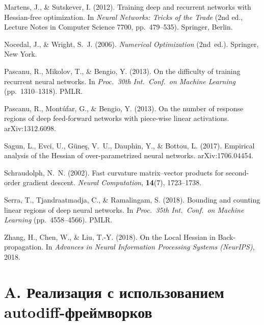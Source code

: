 \documentclass[11pt]{article}
\begin{document}
\begin{thebibliography}{99}
  Martens, J., \& Sutskever, I. (2012).
  \newblock Training deep and recurrent networks with Hessian-free optimization.
  \newblock In \emph{Neural Networks: Tricks of the Trade}
  (2nd ed., Lecture Notes in Computer Science 7700, pp.~479--535).
  Springer, Berlin.

  Nocedal, J., \& Wright, S.~J. (2006).
  \newblock \emph{Numerical Optimization} (2nd~ed.).
  \newblock Springer, New York.

  Pascanu, R., Mikolov, T., \& Bengio, Y. (2013{}).
  \newblock On the difficulty of training recurrent neural networks.
  \newblock In \emph{Proc.\ 30th Int.\ Conf.\ on Machine Learning}
  (pp.~1310--1318). PMLR.

  Pascanu, R., Montúfar, G., \& Bengio, Y. (2013{}).
  \newblock On the number of response regions of deep feed-forward networks with
  piece-wise linear activations.
  \newblock arXiv:1312.6098.

  Sagun, L., Evci, U., Güneş, V.~U., Dauphin, Y., \& Bottou, L. (2017).
  \newblock Empirical analysis of the Hessian of over-parametrized neural
  networks.
  \newblock arXiv:1706.04454.

  Schraudolph, N.~N. (2002).
  \newblock Fast curvature matrix–vector products for second-order gradient
  descent.
  \newblock \emph{Neural Computation}, \textbf{14}(7), 1723--1738.

  Serra, T., Tjandraatmadja, C., \& Ramalingam, S. (2018).
  \newblock Bounding and counting linear regions of deep neural networks.
  \newblock In \emph{Proc.\ 35th Int.\ Conf.\ on Machine Learning}
  (pp.~4558--4566). PMLR.

  Zhang, H., Chen, W., \& Liu, T.-Y. (2018).
  \newblock On the Local Hessian in Back-propagation.
  \newblock In \emph{Advances in Neural Information Processing Systems (NeurIPS)}, 2018.

\end{thebibliography}

\appendix
\section*{A. Реализация с использованием autodiff-фреймворков}
\end{document}
